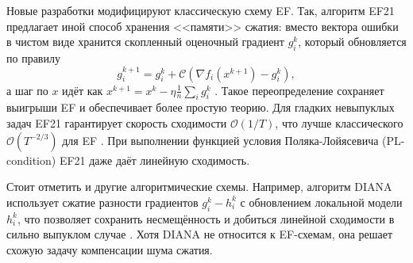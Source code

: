     Новые разработки модифицируют классическую схему EF. Так, алгоритм EF21 \cite{richtárik2021ef21newsimplertheoretically} предлагает иной способ хранения <<памяти>> сжатия: вместо вектора ошибки в чистом виде хранится скопленный оценочный градиент $g_i^k$, который обновляется по правилу 
    \begin{equation}
        g_i^{k+1} = g_i^k + \mathcal{C}\left(\nabla f_i(x^{k+1}) - g_i^k\right),
    \end{equation}
    а шаг по $x$ идёт как $x^{k+1} = x^k - \eta\frac{1}{n}\sum_i g_i^k$ \cite{richtárik2021ef21newsimplertheoretically}. Такое переопределение сохраняет выигрыши EF и обеспечивает более простую теорию. Для гладких невыпуклых задач EF21 гарантирует скорость сходимости $\mathcal{O}(1/T)$, что лучше классического $\mathcal{O}(T^{-2/3})$ для EF \cite{richtárik2021ef21newsimplertheoretically}. При выполнении функцией условия Поляка-Лойясевича (PL-condition) EF21 даже даёт линейную сходимость. 

    Стоит отметить и другие алгоритмические схемы. Например, алгоритм DIANA использует сжатие разности градиентов $g_i^k - h_i^k$ с обновлением локальной модели $h_i^k$, что позволяет сохранить несмещённость и добиться линейной сходимости в сильно выпуклом случае \cite{mishchenko2023distributedlearningcompressedgradient}. Хотя DIANA не относится к EF-схемам, она решает схожую задачу компенсации шума сжатия.


